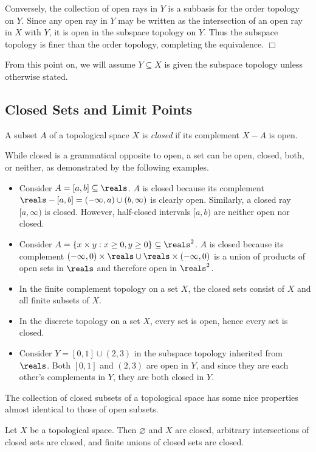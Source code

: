 Conversely, the collection of open rays in $Y$ is a subbasis for the order topology on $Y.$ Since any open ray in $Y$ may be written as the intersection of an open ray in $X$ with $Y$, it is open in the subspace topology on $Y$. Thus the subspace topology is finer than the order topology, completing the equivalence. $\Box$

From this point on, we will assume $Y \subseteq X$ is given the subspace topology unless otherwise stated.

\subsection{Closed Sets and Limit Points}
\begin{definition}\label{2.19}
    A subset $A$ of a topological space $X$ is {\it closed} if its complement $X -A$ is open.
\end{definition}
While closed is a grammatical opposite to open, a set can be open, closed, both, or neither, as demonstrated by the following examples.

\begin{itemize}
    \item Consider $A = [a, b] \subseteq \reals$. $A$ is closed because its complement $\reals - [a, b] = (-\infty, a) \cup (b, \infty)$ is clearly open. Similarly, a closed ray $[a, \infty)$ is closed. However, half-closed intervals $[a, b)$ are neither open nor closed.
    \item Consider $A = \{x \times y: x\geq 0, y \geq 0\} \subseteq \reals^2$. $A$ is closed because its complement $(-\infty, 0) \times \reals \cup \reals \times (-\infty, 0)$ is a union of products of open sets in $\reals$ and therefore open in $\reals^2$.
    \item In the finite complement topology on a set $X$, the closed sets consist of $X$ and all finite subsets of $X$.
    \item In the discrete topology on a set $X$, every set is open, hence every set is closed.
    \item Consider $Y = [0, 1] \cup (2, 3)$ in the subspace topology inherited from $\reals$. Both $[0, 1]$ and $(2, 3)$ are open in $Y$, and since they are each other's complements in $Y$, they are both closed in $Y$.
\end{itemize}

The collection of closed subsets of a topological space has some nice properties almost identical to those of open subsets.
\begin{theorem}\label{2.20}
    Let $X$ be a topological space. Then $\varnothing$ and $X$ are closed, arbitrary intersections of closed sets are closed, and finite unions of closed sets are closed.
\end{theorem}

